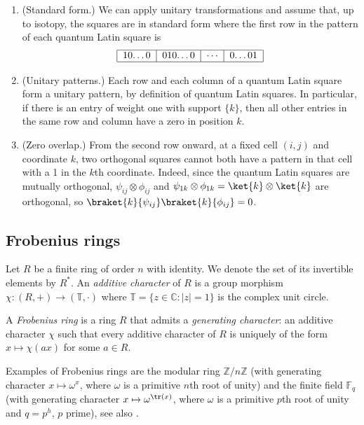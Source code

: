 \documentclass[a4paper]{article}
\theoremstyle{definition}
\newcommand{\FF}{\mathbb F}
\newcommand{\ZZ}{\mathbb Z}
\begin{document}
\begin{mdframed}
\begin{enumerate}
    \item[\#1] (Standard form.) We can apply unitary transformations and assume that, up to isotopy, the squares are in standard form where the first row in the pattern of each quantum Latin square is
    \[\begin{tabular}{|c|c|c|c|}
    \hline
    10\dots0 & 010\dots0 & \(\cdots\) & 0\dots01\\
    \hline
    \end{tabular}\]
    \item[\#2] (Unitary patterns.) Each row and each column of a quantum Latin square form a unitary pattern, by definition of quantum Latin squares. In particular, if there is an entry of weight one with support \(\{k\}\), then all other entries in the same row and column have a zero in position \(k\).
    \item[\#3] (Zero overlap.) From the second row onward, at a fixed cell \((i,j)\) and coordinate \(k\), two orthogonal squares cannot both have a pattern in that cell with a 1 in the \(k\)th coordinate. Indeed, since the quantum Latin squares are mutually orthogonal, \(\psi_{ij}\otimes\phi_{ij}\) and \(\psi_{1k}\otimes\phi_{1k}=\ket{k}\otimes\ket{k}\) are orthogonal, so \(\braket{k}{\psi_{ij}}\braket{k}{\phi_{ij}}=0\).
\end{enumerate}
\end{mdframed}

\subsection{Frobenius rings}

Let $R$ be a finite ring of order \(n\) with identity. We denote the set of its invertible elements by \(R^*\). An \emph{additive character} of $R$ is a group morphism \(\chi:(R,+)\to(\mathbb{T},\cdot)\) where \(\mathbb{T}=\{z\in\mathbb{C}:|z|=1\}\) is the complex unit circle.

A \emph{Frobenius ring} is a ring $R$ that admits a \emph{generating character}: an additive character $\chi$ such that every additive character of \(R\) is uniquely of the form \(x\mapsto\chi(ax)\) for some \(a\in R\).

Examples of Frobenius rings are the modular ring \(\ZZ/n\ZZ\) (with generating character \(x\mapsto\omega^x\), where \(\omega\) is a primitive \(n\)th root of unity) and the finite field \(\FF_q\) (with generating character \(x\mapsto\omega^{\tr(x)}\), where \(\omega\) is a primitive \(p\)th root of unity and \(q=p^h\), \(p\) prime), see also \cite{Frobenius}.
\end{document}
